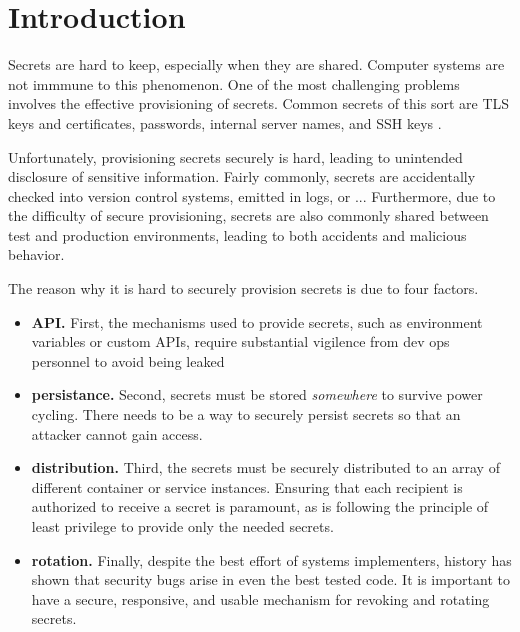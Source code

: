 \section{Introduction}
\label{SEC:introduction}


Secrets are hard to keep, especially when they are shared.  Computer systems
are not immmune to this phenomenon.  
One of the most challenging problems
involves the effective provisioning of secrets.  Common secrets of this
sort are TLS keys and certificates, passwords, internal server names, and SSH 
keys .  

Unfortunately, provisioning secrets securely is hard, leading to unintended
disclosure of sensitive information.  Fairly commonly, secrets are 
accidentally checked into version control systems, emitted in logs, or 
...   Furthermore, due to the difficulty of secure provisioning, secrets
are also commonly shared between test and production environments, leading
to both accidents and malicious behavior.


The reason why it is hard to securely provision
secrets is due to four factors.  
\begin{itemize}
\item {\bf API.} First, the mechanisms used to provide
secrets, such as environment variables or custom APIs, require substantial
vigilence from dev ops personnel to avoid being leaked~   
\item {\bf persistance.} Second, secrets must be stored
\emph{somewhere} to survive power cycling.  There needs to be a way to 
securely persist secrets so that an attacker cannot gain access.
\item {\bf distribution.} Third, the secrets must be securely distributed
to an array of different container or service instances.  Ensuring that
each recipient is authorized to receive a secret is paramount, as is
following the principle of least privilege to provide only the needed
secrets.
\item {\bf rotation.} Finally, despite the best effort of systems
implementers, history has shown that security bugs arise in even
the best tested code.  It is important to have a secure, responsive, and
usable mechanism for revoking and rotating secrets.  
\end{itemize}


